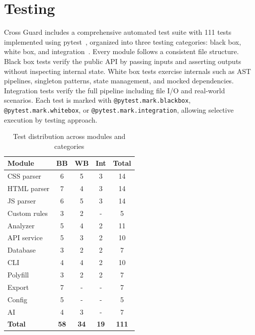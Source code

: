 \section{Testing}
\label{sec:testing}

Cross Guard includes a comprehensive automated test suite with 111 tests implemented using pytest~\cite{pytestdocs}, organized into three testing categories: black box, white box, and integration~\cite{myers2011testing}. Every module follows a consistent file structure. Black box tests verify the public API by passing inputs and asserting outputs without inspecting internal state. White box tests exercise internals such as AST pipelines, singleton patterns, state management, and mocked dependencies. Integration tests verify the full pipeline including file I/O and real-world scenarios. Each test is marked with \texttt{@pytest.mark.blackbox}, \texttt{@pytest.mark.whitebox}, or \texttt{@pytest.mark.integration}, allowing selective execution by testing approach.

\begin{table}[H]
    \centering
    \begin{tabular}{|l|c|c|c|c|}
        \hline
        \textbf{Module} & \textbf{BB} & \textbf{WB} & \textbf{Int} & \textbf{Total} \\
        \hline \hline
        CSS parser    & 6 & 5 & 3 & 14 \\ \hline
        HTML parser   & 7 & 4 & 3 & 14 \\ \hline
        JS parser     & 6 & 5 & 3 & 14 \\ \hline
        Custom rules  & 3 & 2 & - & 5  \\ \hline
        Analyzer      & 5 & 4 & 2 & 11 \\ \hline
        API service   & 5 & 3 & 2 & 10 \\ \hline
        Database      & 3 & 2 & 2 & 7  \\ \hline
        CLI           & 4 & 4 & 2 & 10 \\ \hline
        Polyfill      & 3 & 2 & 2 & 7  \\ \hline
        Export        & 7 & - & - & 7  \\ \hline
        Config        & 5 & - & - & 5  \\ \hline
        AI            & 4 & 3 & - & 7  \\ \hline
        \textbf{Total} & \textbf{58} & \textbf{34} & \textbf{19} & \textbf{111} \\ \hline
    \end{tabular}
    \caption{Test distribution across modules and categories}
    \label{tab:test-distribution}
\end{table}

